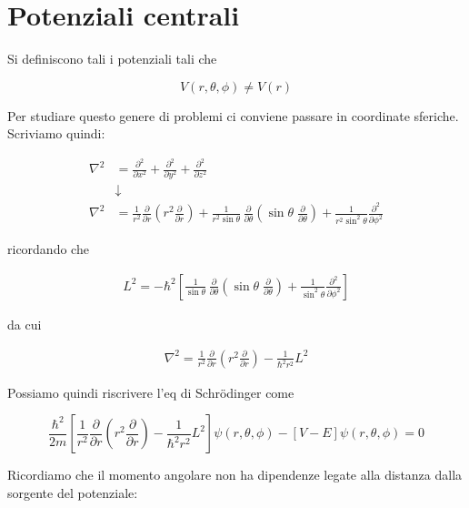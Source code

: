 \newpage

\section{Potenziali centrali}

Si definiscono tali i potenziali tali che

\begin{equation}
V(r,\theta,\phi) \neq V(r)
\end{equation}

Per studiare questo genere di problemi ci conviene passare in coordinate sferiche. Scriviamo quindi:

\begin{align}
\nabla^2 {}&= \frac{\partial^2}{\partial x ^2} + \frac{\partial^2}{\partial y^2} + \frac{\partial^2}{\partial z^2}  \nonumber \\
&\downarrow \nonumber \\
\nabla^2 &=\frac{1}{r^2}\frac{\partial}{\partial r}\left(  r^2  \frac{\partial}{\partial r}  \right) + 
\frac{1}{r^2 \sin{\theta}}\, \frac{\partial}{\partial \theta}\left(  \sin{\theta} \; \frac{\partial}{\partial \theta}  \right) + 
\frac{1}{r^2 \sin^2{\theta}}\frac{\partial^2}{\partial \phi^2}
\end{align}

ricordando che

\begin{align}
L^2= - \hbar^2 \left[
\frac{1}{\sin{\theta}}\, \frac{\partial}{\partial \theta}\left(  \sin{\theta} \; \frac{\partial}{\partial \theta}  \right) +
\frac{1}{\sin^2{\theta}}\frac{\partial^2}{\partial \phi^2}
\right]
\end{align}

da cui

\begin{align}
\nabla^2 = \frac{1}{r^2}\frac{\partial}{\partial r}\left(  r^2  \frac{\partial}{\partial r}  \right) - \frac{1}{\hbar^2 r^2}L^2
\end{align}

Possiamo quindi riscrivere l'eq di Schrödinger come

\begin{equation}
\frac{\hbar^2}{2 m}
\left[
\frac{1}{r^2}\frac{\partial}{\partial r}\left(  r^2  \frac{\partial}{\partial r}  \right) - \frac{1}{\hbar^2 r^2}L^2
\right]\psi(r,\theta,\phi) - [V - E]\psi(r,\theta,\phi)=0
\end{equation}

Ricordiamo che il momento angolare non ha dipendenze legate alla distanza dalla sorgente del potenziale:

